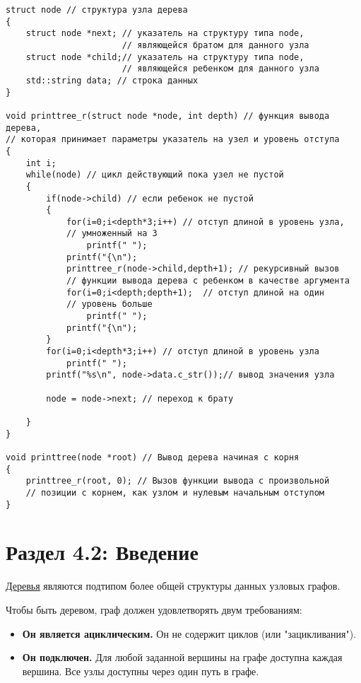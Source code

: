 \vspace{\baselineskip}
\begin{tcolorbox}
\begin{verbatim}
struct node // структура узла дерева
{
	struct node *next; // указатель на структуру типа node, 
					   // являющейся братом для данного узла
	struct node *child;// указатель на структуру типа node, 
					   // являющейся ребенком для данного узла
	std::string data; // строка данных
}

void printtree_r(struct node *node, int depth) // функция вывода дерева, 
// которая принимает параметры указатель на узел и уровень отступа
{
	int i;
	while(node) // цикл действующий пока узел не пустой
	{
		if(node->child) // если ребенок не пустой
		{
			for(i=0;i<depth*3;i++) // отступ длиной в уровень узла, 
			// умноженный на 3
				printf(" ");
			printf("{\n");
			printtree_r(node->child,depth+1); // рекурсивный вызов 
			// функции вывода дерева с ребенком в качестве аргумента
			for(i=0;i<depth;depth+1);  // отступ длиной на один 
			// уровень больше
				printf(" ");
			printf("{\n");
		}
		for(i=0;i<depth*3;i++) // отступ длиной в уровень узла
			printf(" ");
		printf("%s\n", node->data.c_str());// вывод значения узла

		node = node->next; // переход к брату
		
	}
}

void printtree(node *root) // Вывод дерева начиная с корня			
{
	printtree_r(root, 0); // Вызов функции вывода с произвольной 
	// позиции с корнем, как узлом и нулевым начальным отступом
}
\end{verbatim}
\end{tcolorbox}

\vspace{\baselineskip}
\section*{Раздел 4.2: Введение}

\vspace{\baselineskip}
\href{https://vk.cc/atDAwi}{\underline{Деревья}} являются подтипом более общей структуры данных узловых графов.


{}

\newpage
Чтобы быть деревом, граф должен удовлетворять двум требованиям:

\begin{itemize}
  \item {\bfseries Он является ациклическим.} Он не содержит циклов (или "зацикливания").
  \item {\bfseries Он подключен.} Для любой заданной вершины на графе доступна каждая вершина. Все узлы доступны через один путь в графе.
\end{itemize}

